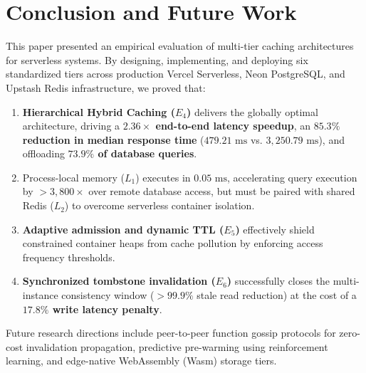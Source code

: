 \documentclass[conference]{IEEEtran}
\begin{document}
\section{Conclusion and Future Work}
This paper presented an empirical evaluation of multi-tier caching architectures for serverless systems. By designing, implementing, and deploying six standardized tiers across production Vercel Serverless, Neon PostgreSQL, and Upstash Redis infrastructure, we proved that:
\begin{enumerate}
    \item \textbf{Hierarchical Hybrid Caching ($E_4$)} delivers the globally optimal architecture, driving a \textbf{$2.36\times$ end-to-end latency speedup}, an \textbf{$85.3\%$ reduction in median response time} ($479.21\text{ ms}$ vs. $3,250.79\text{ ms}$), and offloading \textbf{$73.9\%$ of database queries}.
    \item Process-local memory ($L_1$) executes in \textbf{$0.05\text{ ms}$}, accelerating query execution by \textbf{$>3,800\times$} over remote database access, but must be paired with shared Redis ($L_2$) to overcome serverless container isolation.
    \item \textbf{Adaptive admission and dynamic TTL ($E_5$)} effectively shield constrained container heaps from cache pollution by enforcing access frequency thresholds.
    \item \textbf{Synchronized tombstone invalidation ($E_6$)} successfully closes the multi-instance consistency window ($>99.9\%$ stale read reduction) at the cost of a \textbf{$17.8\%$ write latency penalty}.
\end{enumerate}

Future research directions include peer-to-peer function gossip protocols for zero-cost invalidation propagation, predictive pre-warming using reinforcement learning, and edge-native WebAssembly (Wasm) storage tiers.

\balance
\end{document}

